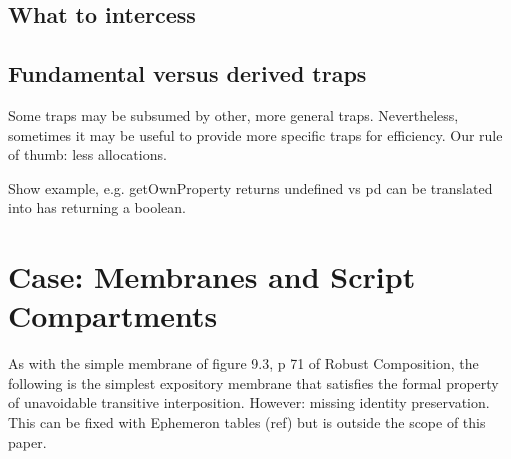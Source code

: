 \documentclass{acm_proc_article-sp}
\begin{document}

\subsection{What to intercess}



\subsection{Fundamental versus derived traps}

Some traps may be subsumed by other, more general traps. Nevertheless, sometimes it may be useful to provide more specific traps for efficiency. Our rule of thumb: less allocations.

Show example, e.g. getOwnProperty returns undefined vs pd can be translated into has returning a boolean.


\section{Case: Membranes and Script Compartments}

As with the simple membrane of figure 9.3, p 71 of Robust Composition, the following is the simplest expository membrane that satisfies the formal property of unavoidable transitive interposition.
However: missing identity preservation. This can be fixed with Ephemeron tables (ref) but is outside the scope of this paper.
\end{document}

